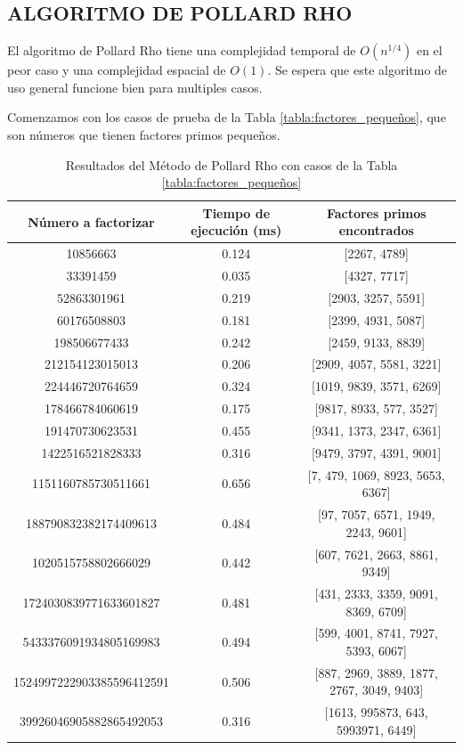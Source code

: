     \subsection{ALGORITMO DE POLLARD RHO}
    El algoritmo de Pollard Rho tiene una complejidad temporal de $O(n^{1/4})$ en el peor caso y una complejidad espacial de $O(1)$. Se espera que este algoritmo de uso general funcione bien para multiples casos.

    Comenzamos con los casos de prueba de la Tabla \ref{tabla:factores_pequeños}, que son números que tienen factores primos pequeños.

    \begin{table}[H]
        \centering
        \begin{adjustbox}{width=\columnwidth,center}
        \begin{tabular}{ccc}
        \toprule
        Número a factorizar & Tiempo de ejecución (ms) & Factores primos encontrados\\
        \midrule
        10856663 & 0.124 & [2267, 4789]\\
        33391459 & 0.035 & [4327, 7717]\\
        52863301961 & 0.219 & [2903, 3257, 5591]\\
        60176508803 & 0.181 & [2399, 4931, 5087]\\
        198506677433 & 0.242 & [2459, 9133, 8839]\\
        212154123015013 & 0.206 & [2909, 4057, 5581, 3221]\\
        224446720764659 & 0.324 & [1019, 9839, 3571, 6269]\\
        178466784060619 & 0.175 & [9817, 8933, 577, 3527]\\
        191470730623531 & 0.455 & [9341, 1373, 2347, 6361]\\
        1422516521828333 & 0.316 & [9479, 3797, 4391, 9001]\\
        1151160785730511661 & 0.656 & [7, 479, 1069, 8923, 5653, 6367]\\
        188790832382174409613 & 0.484 & [97, 7057, 6571, 1949, 2243, 9601]\\
        1020515758802666029 & 0.442 & [607, 7621, 2663, 8861, 9349]\\
        1724030839771633601827 & 0.481 & [431, 2333, 3359, 9091, 8369, 6709]\\
        5433376091934805169983 & 0.494 & [599, 4001, 8741, 7927, 5393, 6067]\\
        1524997222903385596412591 & 0.506 & [887, 2969, 3889, 1877, 2767, 3049, 9403]\\
        39926046905882865492053 & 0.316 & [1613, 995873, 643, 5993971, 6449]\\
        \bottomrule
        \end{tabular}
        \end{adjustbox}

        \caption{Resultados del Método de Pollard Rho con casos de la Tabla \ref{tabla:factores_pequeños}}
        \label{tab:res-pollard-rho-pequeños}
    \end{table}

